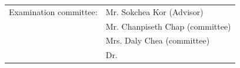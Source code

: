 \begin{titlepage}
    {\englishfont
    \begin{center}
        \begin{tabular}{ll}
            {Examination committee:} & Mr. Sokchea Kor (Advisor) \\
                                            & Mr. Chanpiseth Chap (committee) \\
                                            & Mrs. Daly Chea (committee)\\
                                            & Dr. \dotfill
        \end{tabular}
    \end{center}
    }


    \vfill
\end{titlepage}

